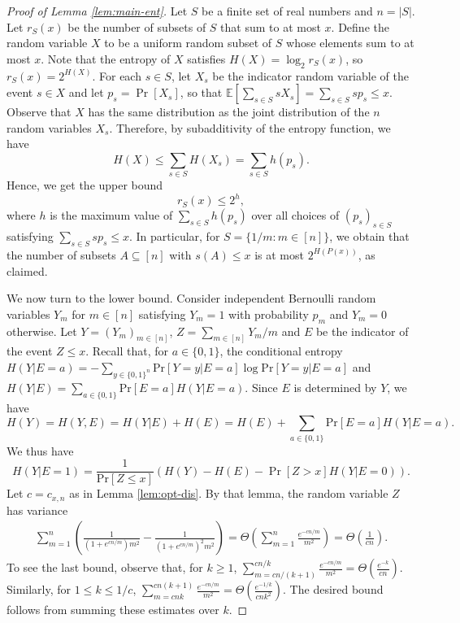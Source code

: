 \documentclass{daj}
\newcommand{\pr}{\mathrm{Pr}}
\begin{document}
\begin{proof}[Proof of Lemma \ref{lem:main-ent}]
Let $S$ be a finite set of real numbers and $n=|S|$. Let $r_S(x)$ be the number of subsets of $S$ that sum to at most $x$. Define the random variable $X$ to be a uniform random subset of $S$ whose elements sum to at most $x$. Note that the entropy of $X$ satisfies $H(X)=\log_2 r_S(x)$, so $r_S(x)=2^{H(X)}$. For each $s \in S$, let $X_s$ be the indicator random variable of the event $s \in X$ and let $p_s = \Pr[X_s]$, so that $\mathbb{E}[\sum_{s\in S}s X_s]=\sum_{s \in S} sp_s \leq x$. Observe that $X$ has the same distribution as the joint distribution of the $n$ random variables $X_s$. Therefore, by subadditivity of the entropy function, we have 
\[
    H(X) \leq \sum_{s \in S}H(X_s)=\sum_{s \in S}h(p_s).
\]
Hence, we get the upper bound 
$$r_S(x) \leq 2^h,$$ 
where $h$ is the maximum value of $\sum_{s \in S} h(p_s)$ over all choices of $(p_s)_{s \in S}$ satisfying $\sum_{s \in S} sp_s \leq x$. In particular, for $S=\{1/m:m\in [n]\}$, we obtain that the number of subsets $A\subseteq [n]$ with $s(A)\le x$ is at most $2^{H(P(x))}$, as claimed. 


We now turn to the lower bound. Consider independent Bernoulli random variables $Y_m$ for $m \in [n]$ satisfying $Y_m=1$ with probability $p_m$ and $Y_m=0$ otherwise. Let $Y=(Y_m)_{m\in [n]}$, $Z=\sum_{m\in [n]} Y_m/m$ and $E$ be the indicator of the event $Z \le x$. Recall that, for $a\in \{0,1\}$, the conditional entropy $H(Y | E=a) = -\sum_{y\in \{0,1\}^n} \pr[Y=y | E=a] \log \pr[Y=y | E=a]$ and $H(Y | E) = \sum_{a\in \{0,1\}} \pr[E=a] H(Y | E=a)$. Since $E$ is determined by $Y$, we have 
\[
    H(Y) = H(Y,E) = H(Y|E) + H(E) = H(E) + \sum_{a\in \{0,1\}} \pr[E=a] H(Y | E=a).
\]
We thus have
\begin{equation}\label{eq:ent-decomp}
H(Y | E=1) = \frac{1}{\pr[Z\le x]}\left(H(Y) - H(E) - \Pr[Z>x] H(Y | E=0)\right). 
\end{equation}
Let $c=c_{x,n}$ as in Lemma \ref{lem:opt-dis}. By that lemma, the random variable $Z$ has variance 
\begin{align}\label{eq:2nd-mm}
    \sum_{m=1}^{n} \left(\frac{1}{(1+e^{cn/m})m^2} - \frac{1}{(1+e^{cn/m})^2m^2}\right) = \Theta\left(\sum_{m=1}^{n} \frac{e^{-cn/m}}{m^2}\right) = \Theta\left(\frac{1}{cn}\right). 
\end{align}
To see the last bound, observe that, for $k \ge 1$,  
$\sum_{m=cn/(k+1)}^{cn/k} \frac{e^{-cn/m}}{m^2} = \Theta(\frac{e^{-k}}{cn})$. Similarly, 
for $1\le k\le 1/c$, $\sum_{m=cnk}^{cn(k+1)} \frac{e^{-cn/m}}{m^2} = \Theta(\frac{e^{-1/k}}{cnk^2})$. The desired bound follows from summing these estimates over $k$. 


\end{proof}
\end{document}
